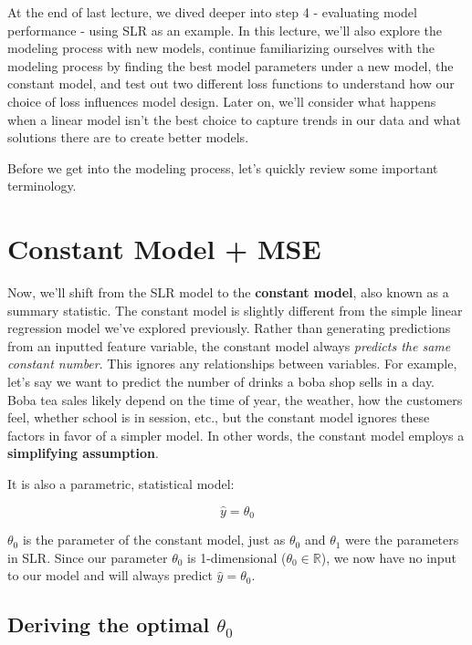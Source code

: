 \documentclass[
  letterpaper,
  DIV=11,
  numbers=noendperiod]{scrreprt}
\begin{document}
At the end of last lecture, we dived deeper into step 4 - evaluating
model performance - using SLR as an example. In this lecture, we'll also
explore the modeling process with new models, continue familiarizing
ourselves with the modeling process by finding the best model parameters
under a new model, the constant model, and test out two different loss
functions to understand how our choice of loss influences model design.
Later on, we'll consider what happens when a linear model isn't the best
choice to capture trends in our data and what solutions there are to
create better models.

Before we get into the modeling process, let's quickly review some
important terminology.

\section{Constant Model + MSE}\label{constant-model-mse}

Now, we'll shift from the SLR model to the \textbf{constant model}, also
known as a summary statistic. The constant model is slightly different
from the simple linear regression model we've explored previously.
Rather than generating predictions from an inputted feature variable,
the constant model always \emph{predicts the same constant number}. This
ignores any relationships between variables. For example, let's say we
want to predict the number of drinks a boba shop sells in a day. Boba
tea sales likely depend on the time of year, the weather, how the
customers feel, whether school is in session, etc., but the constant
model ignores these factors in favor of a simpler model. In other words,
the constant model employs a \textbf{simplifying assumption}.

It is also a parametric, statistical model:

\[\hat{y} = \theta_0\]

\(\theta_0\) is the parameter of the constant model, just as
\(\theta_0\) and \(\theta_1\) were the parameters in SLR. Since our
parameter \(\theta_0\) is 1-dimensional (\(\theta_0 \in \mathbb{R}\)),
we now have no input to our model and will always predict
\(\hat{y} = \theta_0\).

\subsection{\texorpdfstring{Deriving the optimal
\(\theta_0\)}{Deriving the optimal \textbackslash theta\_0}}\label{deriving-the-optimal-theta_0}
\end{document}
